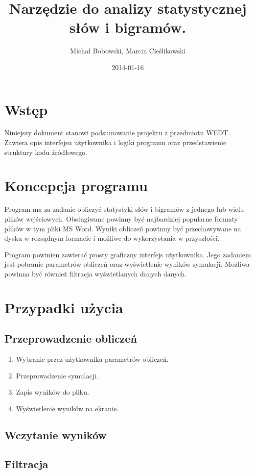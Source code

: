 \documentclass[11pt]{article}
\author{Michał Bobowski, Marcin Cieślikowski}
\date{2014-01-16}
\title{Narzędzie do analizy statystycznej słów i bigramów.}
\begin{document}
  \maketitle

\section{Wstęp}
Niniejszy dokument stanowi podsumowanie projektu z przedmiotu WEDT.
Zawiera opis interfejsu użytkownika i logiki programu oraz przedstawienie struktury kodu źródłowego.

\section{Koncepcja programu}
Program ma za zadanie obliczyć statystyki słów i bigramów z jednego lub wielu plików wejściowych.
Obsługiwane powinny być najbardziej popularne formaty plików w tym pliki MS Word.
Wyniki obliczeń powinny być przechowywane na dysku w rozsądnym formacie i możliwe do wykorzystania w przyszłości.

Program powinien zawierać prosty graficzny interfejs użytkownika.
Jego zadaniem jest pobranie parametrów obliczeń oraz wyświetlenie wyników symulacji.
Możliwa powinna być również filtracja wyświetlanych danych danych.

\section{Przypadki użycia}
\subsection{Przeprowadzenie obliczeń}
\begin{enumerate}
 \item Wybranie przez użytkownika parametrów obliczeń.
 \item Przeprowadzenie symulacji.
 \item Zapis wyników do pliku.
 \item Wyświetlenie wyników na ekranie.
\end{enumerate}
\subsection{Wczytanie wyników}
\subsection{Filtracja}
\end{document}
